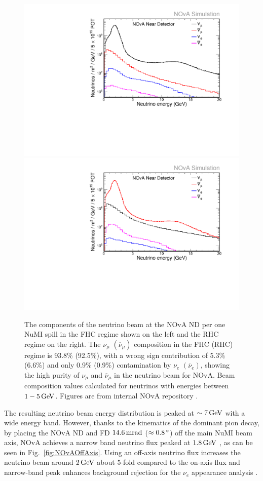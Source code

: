 \begin{figure}[!htb]  
  \centering
  \includegraphics*[width=.495\textwidth]{Plots/NOvAExperiment/NuMIBeamComponentsNDFHC.pdf}
  \noindent\centering
  \includegraphics*[width=.495\textwidth]{Plots/NOvAExperiment/NuMIBeamComponentsNDRHC.pdf}
  \caption[NuMI neutrino beam components in the NOvA near detector]{The components of the neutrino beam at the \acrshort{NOvA} \acrshort{ND} per one \acrshort{NuMI} spill in the \acrshort{FHC} regime shown on the left and the \acrshort{RHC} regime on the right. The $\nu_\mu$ $\left(\overline{\nu}_\mu\right)$ composition in the \acrshort{FHC} (\acrshort{RHC}) regime is 93.8\% (92.5\%), with a wrong sign contribution of 5.3\% (6.6\%) and only 0.9\% (0.9\%) contamination by $\nu_e$ $\left(\overline{\nu}_e\right)$, showing the high purity of $\nu_\mu$ and $\overline{\nu}_\mu$ in the neutrino beam for \acrshort{NOvA}. Beam composition values calculated for neutrinos with energies between $\unit[1-5]{GeV}$. Figures are from internal \acrshort{NOvA} repository \cite{NOvA-doc-20843}.}
 \label{fig:NOvABeamComponents}
\end{figure}

The resulting neutrino beam energy distribution is peaked at $\sim\unit[7]{GeV}$ with a wide energy band. However, thanks to the kinematics of the dominant pion decay, by placing the \gls{NOvA} \gls{ND} and \gls{FD} $\unit[14.6]{mrad}$ ($\approx\unit[0.8]{\degree}$) off the main \gls{NuMI} beam axis, \gls{NOvA} achieves a narrow band neutrino flux peaked at $\unit[1.8]{GeV}$ \cite{NOvAResults2021.pdf,NOvATechreport.pdf}, as can be seen in Fig.~\ref{fig:NOvAOffAxis}. Using an off-axis neutrino flux increases the neutrino beam around $\unit[2]{GeV}$ about 5-fold compared to the on-axis flux and narrow-band peak enhances background rejection for the $\nu_e$ appearance analysis \cite{NOvATechreport.pdf}.

